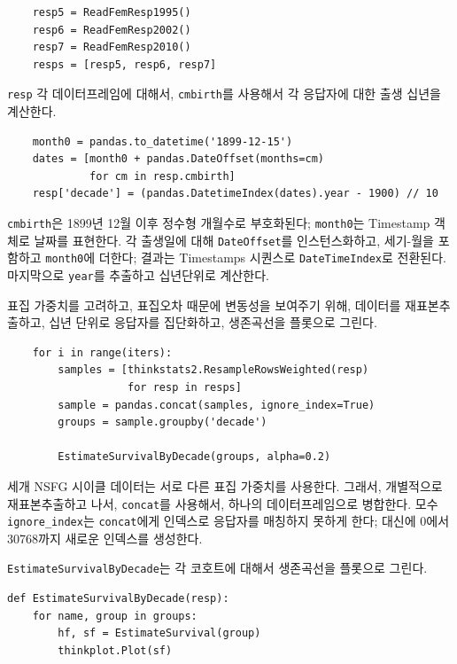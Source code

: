 \begin{verbatim}
    resp5 = ReadFemResp1995()
    resp6 = ReadFemResp2002()
    resp7 = ReadFemResp2010()
    resps = [resp5, resp6, resp7]
\end{verbatim}

{\tt resp} 각 데이터프레임에 대해서, {\tt cmbirth}를 사용해서 각 응답자에 대한 출생 십년을 계산한다.

\begin{verbatim}
    month0 = pandas.to_datetime('1899-12-15')
    dates = [month0 + pandas.DateOffset(months=cm) 
             for cm in resp.cmbirth]
    resp['decade'] = (pandas.DatetimeIndex(dates).year - 1900) // 10
\end{verbatim}

{\tt cmbirth}은 1899년 12월 이후 정수형 개월수로 부호화된다; {\tt month0}는 Timestamp 객체로 날짜를 표현한다. 각 출생일에 대해 {\tt DateOffset}를 인스턴스화하고, 세기-월을 포함하고 {\tt month0}에 더한다; 결과는 
Timestamps 시퀀스로 {\tt DateTimeIndex}로 전환된다. 마지막으로 {\tt year}를 추출하고 십년단위로 계산한다.

표집 가중치를 고려하고, 표집오차 때문에 변동성을 보여주기 위해, 데이터를 재표본추출하고, 십년 단위로 응답자를 집단화하고, 생존곡선을 플롯으로 그린다.

\begin{verbatim}
    for i in range(iters):
        samples = [thinkstats2.ResampleRowsWeighted(resp) 
                   for resp in resps]
        sample = pandas.concat(samples, ignore_index=True)
        groups = sample.groupby('decade')

        EstimateSurvivalByDecade(groups, alpha=0.2)
\end{verbatim}

세개 NSFG 시이클 데이터는 서로 다른 표집 가중치를 사용한다. 그래서, 개별적으로 재표본추출하고 나서, {\tt concat}를 사용해서, 하나의 데이터프레임으로 병합한다. 모수 \verb"ignore_index"는 {\tt concat}에게
인덱스로 응답자를 매칭하지 못하게 한다; 대신에 0에서 30768까지 새로운 인덱스를 생성한다.

{\tt EstimateSurvivalByDecade}는 각 코호트에 대해서 생존곡선을 플롯으로 그린다.

\begin{verbatim}
def EstimateSurvivalByDecade(resp):
    for name, group in groups:
        hf, sf = EstimateSurvival(group)
        thinkplot.Plot(sf)
\end{verbatim}

